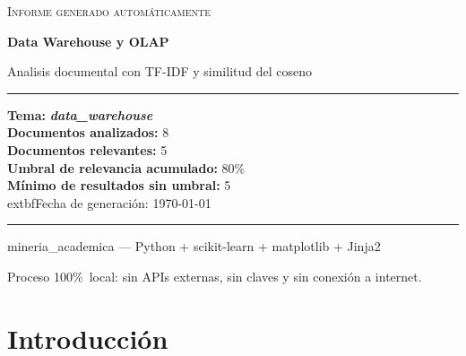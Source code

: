 \documentclass[11pt,a4paper]{article}
\newcommand{\tema}[1]{\textbf{\textit{#1}}}
\newcommand{\pcento}{\%}
\begin{document}
\begin{titlepage}
  \centering
  \vspace*{2.0cm}

  {\Large\textsc{Informe generado automáticamente}\par}
  \vspace{0.7cm}
  {\huge\bfseries Data Warehouse y OLAP\par}
  \vspace{0.4cm}
  {\large Analisis documental con TF-IDF y similitud del coseno\par}

  \vspace{1.8cm}

  \begin{minipage}{0.92\textwidth}
    \hrule
    \vspace{0.4cm}
    {\small
    \textbf{Tema:} \tema{ data\_warehouse }\\[4pt]
    \textbf{Documentos analizados:} 8\\
    \textbf{Documentos relevantes:} 5\\
    \textbf{Umbral de relevancia acumulado:} 80\pcento\\
    \textbf{Mínimo de resultados sin umbral:} 5\\
      	extbf{Fecha de generación:} \today
    \par}
    \vspace{0.4cm}
    \hrule
  \end{minipage}

  \vfill

  {\small mineria\_academica --- Python + scikit-learn + matplotlib + Jinja2\par}
  {\footnotesize
   Proceso 100\pcento\ local: sin APIs externas, sin claves y sin conexión
   a internet.\par}
\end{titlepage}

\tableofcontents
\newpage

\section{Introducción}
\label{sec:introduccion}
\end{document}
